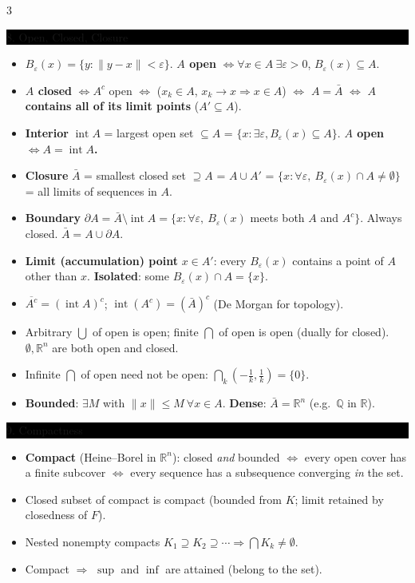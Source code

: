 \documentclass[8pt,letterpaper]{article}
\makeatletter
\newcommand{\sect}[1]{%
  \vspace{2.2pt}%
  \noindent\colorbox{black}{\parbox{\dimexpr\linewidth-2\fboxsep}{%
    \color{white}\bfseries\scshape\fontsize{6.4}{7.4}\selectfont
    \hyphenpenalty=10000\exhyphenpenalty=10000\raggedright #1}}%
  \vspace{1.4pt}\par\nopagebreak\@afterheading}
\newenvironment{tl}
  {\begin{itemize}[leftmargin=6pt,itemsep=0.3pt,topsep=1pt,parsep=0pt,
                   partopsep=0pt,label=\textcolor{gray}{\tiny$\bullet$}]}
  {\end{itemize}}
\newcommand{\R}{\mathbb{R}}
\newcommand{\Rn}{\mathbb{R}^n}
\newcommand{\intr}{\operatorname{int}}
\newcommand{\nm}[1]{\lVert #1\rVert}
\makeatother
\begin{document}
\begin{multicols}{3}
\sect{8. Open, Closed, Closure}
\begin{tl}
\item $B_\varepsilon(x)=\{y:\nm{y-x}<\varepsilon\}$. \textbf{$A$ open} $\iff\forall x\in A\ \exists\varepsilon>0$, $B_\varepsilon(x)\subseteq A$.
\item \textbf{$A$ closed} $\iff A^c$ open $\iff$ ($x_k\in A$, $x_k\to x\Rightarrow x\in A$) $\iff$ \textbf{$A=\bar A$} $\iff$ \textbf{$A$ contains all of its limit points} ($A'\subseteq A$).
\item \textbf{Interior} $\intr A$ = largest open set $\subseteq A$ = $\{x: \exists\varepsilon, B_\varepsilon(x)\subseteq A\}$. \textbf{$A$ open $\iff A=\intr A$.}
\item \textbf{Closure} $\bar A$ = smallest closed set $\supseteq A$ = $A\cup A'$ = $\{x: \forall\varepsilon,\ B_\varepsilon(x)\cap A\ne\emptyset\}$ = all limits of sequences in $A$.
\item \textbf{Boundary} $\partial A=\bar A\setminus\intr A=\{x:\forall\varepsilon,\ B_\varepsilon(x)$ meets both $A$ and $A^c\}$. Always closed. $\bar A=A\cup\partial A$.
\item \textbf{Limit (accumulation) point} $x\in A'$: every $B_\varepsilon(x)$ contains a point of $A$ other than $x$. \textbf{Isolated}: some $B_\varepsilon(x)\cap A=\{x\}$.
\item $\overline{A^c}=(\intr A)^c$; $\intr(A^c)=(\bar A)^c$ (De Morgan for topology).
\item Arbitrary $\bigcup$ of open is open; finite $\bigcap$ of open is open (dually for closed). $\emptyset,\Rn$ are both open and closed.
\item \colorbox{black!12}{Infinite $\bigcap$ of open need not be open:} $\bigcap_k(-\frac1k,\frac1k)=\{0\}$.
\item \textbf{Bounded}: $\exists M$ with $\nm{x}\le M\ \forall x\in A$. \textbf{Dense}: $\bar A=\Rn$ (e.g.\ $\mathbb Q$ in $\R$).
\end{tl}

\sect{9. Compactness}
\begin{tl}
\item \textbf{Compact} (Heine--Borel in $\Rn$): closed \emph{and} bounded $\iff$ every open cover has a finite subcover $\iff$ every sequence has a subsequence converging \emph{in} the set.
\item Closed subset of compact is compact (bounded from $K$; limit retained by closedness of $F$).
\item Nested nonempty compacts $K_1\supseteq K_2\supseteq\cdots\Rightarrow\bigcap K_k\neq\emptyset$.
\item Compact $\Rightarrow$ $\sup$ and $\inf$ are attained (belong to the set).
\end{tl}


\end{multicols}
\end{document}
